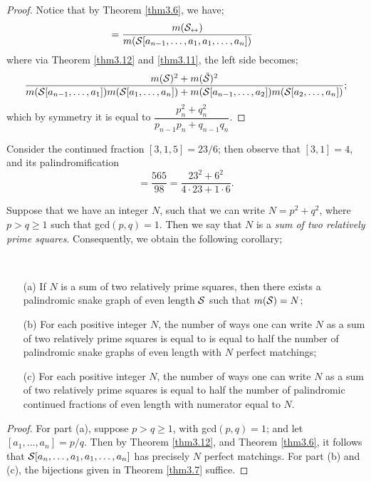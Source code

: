 \begin{proof}
    Notice that by Theorem \ref{thm3.6}, we have;
    \begin{align}
        [a_n,\dots,a_1,a_1,\dots,a_n] &= \dfrac{m(\pal{\s})}{m(\s[a_{n-1},\dots,a_1,a_1,\dots,a_n])}
    \end{align}
    where via Theorem \ref{thm3.12} and \ref{thm3.11}, the left side becomes;
    \begin{equation*}
        \dfrac{m(\mathcal{S})^2 + m(\Tilde{\mathcal{S}})^2}{m(\mathcal{S}[a_{n-1},\dots,a_1])m(\mathcal{S}[a_1,\dots,a_n])+ m(\mathcal{S}[a_{n-1},\dots,a_2])m(\mathcal{S}[a_2,\dots,a_n])};
    \end{equation*}
    which by symmetry it is equal to $ \dfrac{p_n^2 + q_n^2}{p_{n-1}p_n + q_{n-1}q_n}$.
\end{proof}
\begin{example}
    Consider the continued fraction $[3,1,5] = 23/6$; then observe that $[3,1] = 4$, and its palindromification
    \begin{equation*}
        [5,1,3,3,1,5] = \dfrac{565}{98}= \dfrac{23^2 + 6^2}{4 \cdot 23 + 1 \cdot 6}.
    \end{equation*}
\end{example}
Suppose that we have an integer $N$, such that we can write $N = p^2 + q^2$, where $p > q \geq 1$ such that gcd$(p,q) = 1$. Then we say that $N$ is a \emph{sum of two relatively prime squares}. Consequently, we obtain the following corollary;
\begin{corollary}~ 
    \begin{itemize}
        \item[(a)] If $N$ is a sum of two relatively prime squares, then there exists a palindromic snake graph of even length $\mathcal{S}$ such that $m(\mathcal{S}) = N$;
        \item[(b)] For each positive integer $N$, the number of ways one can write $N$ as a sum of two relatively prime squares is equal to is equal to half the number of palindromic snake graphs of even length with $N$ perfect matchings;
        \item[(c)] For each positive integer $N$, the number of ways one can write $N$ as a sum of two relatively prime squares is equal to half the number of palindromic continued fractions of even length with numerator equal to $N$. 
    \end{itemize}
\end{corollary}
\begin{proof}
    For part (a), suppose $p > q \geq 1$, with gcd$(p,q) = 1$; and let $[a_1,\dots,a_n] = p/q$. Then by Theorem \ref{thm3.12}, and Theorem \ref{thm3.6}, it follows that $\mathcal{S}[a_n,\dots,a_1,a_1,\dots,a_n]$ has precisely $N$ perfect matchings. For part (b) and (c), the bijections given in Theorem \ref{thm3.7} suffice.
\end{proof}
